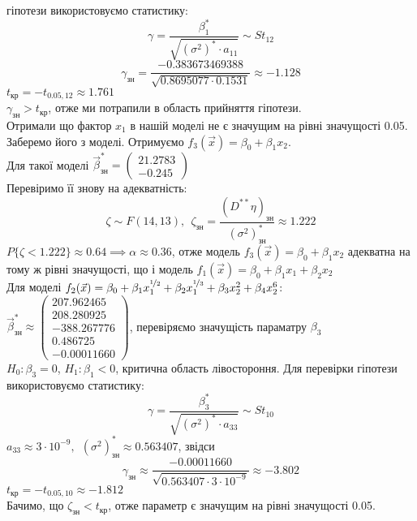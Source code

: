 \documentclass[12 pt]{article}
\newcommand*\circled[1]{\tikz[baseline=(char.base)]{
            \node[shape=circle,draw,inner sep=2pt] (char) {#1};}}
\begin{document}
гіпотези використовуємо статистику:
$$
\gamma = \frac{\beta^*_1}{ \sqrt{(\sigma^2)^* \cdot a_{11}} } \sim St_{12}
$$
$$\gamma_\text{зн} = \frac{-0.383673469388}{ \sqrt{0.8695077 \cdot 0.1531} } \approx 
-1.128$$
$t_\text{кр} = -t_{0.05,12} \approx 1.761$ \\ 
$\gamma_\text{зн} > t_\text{кр}$, отже ми потрапили в область прийняття гіпотези. \\ 
Отримали що фактор $x_1$ в нашій моделі не є значущим на рівні значущості 0.05. \\ 
Заберемо його з моделі. Отримуємо $f_3(\vec{x}) = \beta_0 + \beta_1 x_2 $. \\ 
Для такої моделі $\vec{\beta}^*_\text{зн} = \begin{pmatrix}21.2783 \\-0.245 \end{pmatrix}$ \\ 
Перевіримо її знову на адекватність: \\ 
$$
\zeta \sim F(14, 13), \ \ \zeta_\text{зн} = \frac{(D^{**}\eta)_\text{зн}}{(\sigma^2)^*_\text{зн}} \approx 
1.222
$$
$P \{ \zeta < 1.222 \} \approx 0.64 \implies \alpha \approx 0.36$,
отже модель $f_3(\vec{x}) = \beta_0 + \beta_1 x_2 $ адекватна на тому ж рівні значущості,
що і модель $f_1(\vec{x}) = \beta_0 + \beta_1 x_1 + \beta_2 x_2 $ \\ 
\circled{2} Для моделі $f_2(\vec{x}) = \beta_0 + \beta_1  x_1^{\nicefrac{1}{2}} + \beta_2 x_1^{\nicefrac{1}{3}}
+ \beta_3 x_2^2 + \beta_4 x_2^6$: \\ 
$ \vec{\beta}^*_\text{зн} \approx 
\begin{pmatrix}207.962465 \\208.280925 \\-388.267776 \\0.486725 \\-0.00011660 \end{pmatrix}
$, перевіряємо значущість параматру $\beta_3$ \\ 
$H_0: \beta_3 = 0$, $H_1 : \beta_1 < 0$, критична область лівостороння. Для перевірки 
гіпотези використовуємо статистику:
$$
\gamma = \frac{\beta^*_3}{ \sqrt{(\sigma^2)^* \cdot a_{33}} } \sim St_{10}
$$
$a_{33} \approx 3\cdot 10^{-9}, \ \ (\sigma^2)^*_\text{зн} \approx 0.563407$, звідси
$$
\gamma_\text{зн} \approx 
\frac{-0.00011660}{ \sqrt{0.563407 \cdot 3 \cdot 10^{-9}} } \approx -3.802
$$
$t_\text{кр} = -t_{0.05,10} \approx -1.812$ \\ 
Бачимо, що $\zeta_\text{зн} < t_\text{кр}$, отже параметр є значущим на рівні значущості 0.05.  
\end{document}
